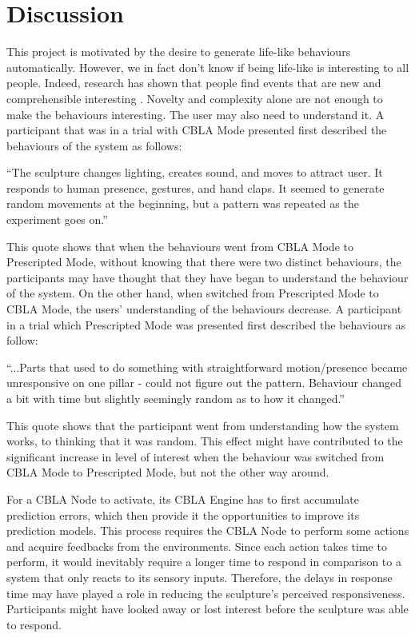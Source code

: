 \section{Discussion}


This project is motivated by the desire to generate life-like behaviours automatically. However, we in fact don't know if being life-like is interesting to all people. Indeed, research has shown that people find events that are new and comprehensible interesting \cite{Silvia2008}. Novelty and complexity alone are not enough to make the behaviours interesting. The user may also need to understand it. A participant that was in a trial with CBLA Mode presented first described the behaviours of the system as follows: 
\begin{blockquote}
	``The sculpture changes lighting, creates sound, and moves to attract user. It responds to human presence, gestures, and hand claps. It seemed to generate random movements at the beginning, but a pattern was repeated as the experiment goes on.''
\end{blockquote}
This quote shows that when the behaviours went from CBLA Mode to Prescripted Mode, without knowing that there were two distinct behaviours, the participants may have thought that they have began to understand the behaviour of the system. On the other hand, when switched from Prescripted Mode to CBLA Mode, the users' understanding of the behaviours decrease. A participant in a trial which Prescripted Mode was presented first described the behaviours as follow:
\begin{blockquote}
	``...Parts that used to do something with straightforward motion/presence became unresponsive on one pillar - could not figure out the pattern. Behaviour changed a bit with time but slightly seemingly random as to how it changed.''
\end{blockquote}
This quote shows that the participant went from understanding how the system works, to thinking that it was random. This effect might have contributed to the significant increase in level of interest when the behaviour was switched from CBLA Mode to Prescripted Mode, but not the other way around.

For a CBLA Node to activate, its CBLA Engine has to first accumulate prediction errors, which then provide it the opportunities to improve its prediction models. This process requires the CBLA Node to perform some actions and acquire feedbacks from the environments. Since each action takes time to perform, it would inevitably require a longer time to respond in comparison to a system that only reacts to its sensory inputs.
Therefore, the delays in response time may have played a role in reducing the sculpture's perceived responsiveness. Participants might have looked away or lost interest before the sculpture was able to respond. 

